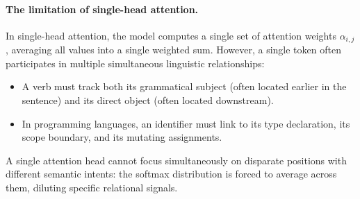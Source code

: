 \documentclass[../../main.tex]{subfiles}
\begin{document}
\paragraph{The limitation of single-head attention.}
In single-head attention, the model computes a single set of attention weights $\alpha_{i, j}$, averaging all values into a single weighted sum. However, a single token often participates in multiple simultaneous linguistic relationships:
\begin{itemize}
    \item A verb must track both its grammatical subject (often located earlier in the sentence) and its direct object (often located downstream).
    \item In programming languages, an identifier must link to its type declaration, its scope boundary, and its mutating assignments.
\end{itemize}
A single attention head cannot focus simultaneously on disparate positions with different semantic intents: the softmax distribution is forced to average across them, diluting specific relational signals.
\end{document}
